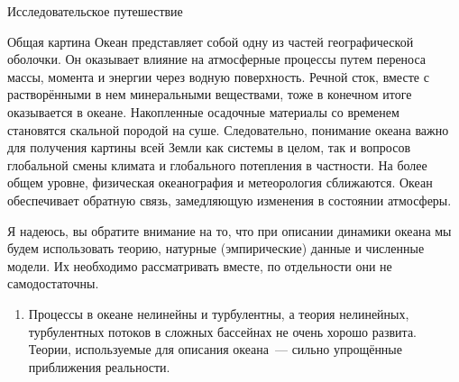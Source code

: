\begin{chapter}{Исследовательское путешествие}
\begin{section}{Общая картина}
Океан представляет собой одну из частей географической оболочки. 
Он оказывает влияние на атмосферные процессы путем переноса массы, момента и
энергии через водную поверхность. Речной сток, вместе с растворёнными в нем
минеральными веществами, тоже в конечном итоге оказывается в океане. 
Накопленные осадочные материалы со временем становятся скальной
породой на суше. Следовательно, понимание океана важно для получения картины 
всей Земли как системы в целом, так и вопросов глобальной смены климата и
глобального потепления в частности. На более общем уровне, физическая 
океанография и метеорология сближаются. Океан обеспечивает обратную связь,
замедляющую изменения в состоянии атмосферы.
%

Я надеюсь, вы обратите внимание на то, что при описании динамики океана мы 
будем использовать теорию, натурные (эмпирические) данные и численные модели. 
Их необходимо рассматривать вместе, по отдельности они не самодостаточны.
%

\begin{enumerate}
\item
Процессы в океане нелинейны и турбулентны, а теория нелинейных, турбулентных 
потоков в сложных бассейнах не очень хорошо развита. Теории, используемые 
для описания океана~--- сильно упрощённые приближения реальности. 
%


\end{enumerate}
\end{section}
\end{chapter}

